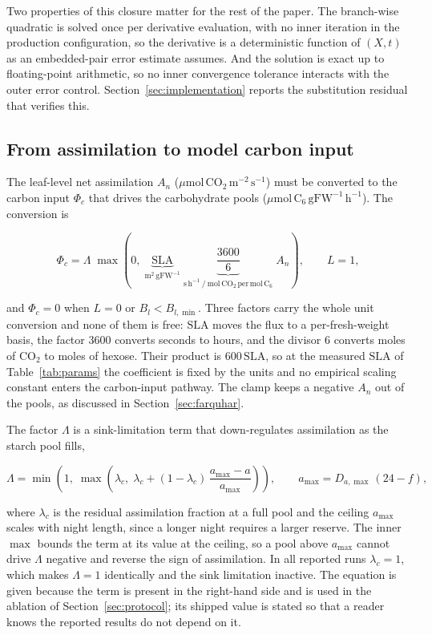 Two properties of this closure matter for the rest of the paper. The branch-wise
quadratic is solved once per derivative evaluation, with no inner iteration in the
production configuration, so the derivative is a deterministic function of $(X,t)$
as an embedded-pair error estimate assumes. And the solution is exact up to
floating-point arithmetic, so no inner convergence tolerance interacts with the
outer error control. Section~\ref{sec:implementation} reports the substitution
residual that verifies this.

\subsection{From assimilation to model carbon input}
\label{sec:conversion}

The leaf-level net assimilation $A_n$
($\mu\mathrm{mol\,CO_2\,m^{-2}\,s^{-1}}$) must be converted to the carbon
input $\Phi_c$ that drives the carbohydrate pools
($\mu\mathrm{mol\,C_6\,gFW^{-1}\,h^{-1}}$). The conversion is

\begin{equation}
\Phi_c = \Lambda\;\max\!\left(0,\;
\underbrace{\mathrm{SLA}}_{\mathrm{m^2\,gFW^{-1}}}\;
\underbrace{\frac{3600}{6}}_{\mathrm{s\,h^{-1}\ /\ mol\,CO_2\,per\,mol\,C_6}}\;
A_n \right),
\qquad L = 1 ,
\label{eq:conversion}
\end{equation}

and $\Phi_c = 0$ when $L = 0$ or $B_l < B_{l,\min}$. Three factors carry the whole
unit conversion and none of them is free: $\mathrm{SLA}$ moves the flux to a
per-fresh-weight basis, the factor $3600$ converts seconds to hours, and the
divisor $6$ converts moles of CO$_2$ to moles of hexose. Their product is
$600\,\mathrm{SLA}$, so at the measured $\mathrm{SLA}$ of Table~\ref{tab:params}
the coefficient is fixed by the units and no empirical scaling constant enters the
carbon-input pathway. The clamp keeps a negative $A_n$ out of the pools, as
discussed in Section~\ref{sec:farquhar}.

The factor $\Lambda$ is a sink-limitation term that down-regulates assimilation
as the starch pool fills,

\begin{equation}
\Lambda = \min\!\left(1,\; \max\!\left(\lambda_c,\;
\lambda_c + (1-\lambda_c)\,\frac{a_{\max} - a}{a_{\max}}\right)\right),
\qquad
a_{\max} = D_{a,\max}\,(24 - f),
\label{eq:feedback}
\end{equation}

where $\lambda_c$ is the residual assimilation fraction at a full pool and the
ceiling $a_{\max}$ scales with night length, since a longer night requires a
larger reserve. The inner $\max$ bounds the term at its value at the ceiling, so a
pool above $a_{\max}$ cannot drive $\Lambda$ negative and reverse the sign of
assimilation. In all reported runs $\lambda_c = 1$, which makes $\Lambda = 1$
identically and the sink limitation inactive. The equation is given because the
term is present in the right-hand side and is used in the ablation of
Section~\ref{sec:protocol}; its shipped value is stated so that a reader knows
the reported results do not depend on it.

